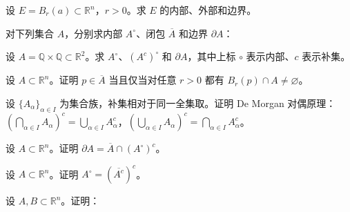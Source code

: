 \noindent\begin{minipage}{\textwidth}
设 $E=B_r(a)\subset\mathbb R^n$，$r>0$。求 $E$ 的内部、外部和边界。
\end{minipage}\par\vfill
\newpage
\noindent\begin{minipage}{\textwidth}
对下列集合 $A$，分别求内部 $A^\circ$、闭包 $\overline A$ 和边界 $\partial A$：
\end{minipage}\par\vfill
\noindent\begin{minipage}{\textwidth}
设 $A=\mathbb Q\times\mathbb Q\subset\mathbb R^2$。求 $A^\circ$、$(A^c)^\circ$ 和 $\partial A$，其中上标 $\circ$ 表示内部、$c$ 表示补集。
\end{minipage}\par\vfill
\noindent\begin{minipage}{\textwidth}
设 $A\subset\mathbb R^n$。证明 $p\in\overline A$ 当且仅当对任意 $r>0$ 都有 $B_r(p)\cap A\ne\varnothing$。
\end{minipage}\par\vfill
\newpage
\noindent\begin{minipage}{\textwidth}
设 $\{A_\alpha\}_{\alpha\in I}$ 为集合族，补集相对于同一全集取。证明 De Morgan 对偶原理：$(\bigcap_{\alpha\in I}A_\alpha)^c=\bigcup_{\alpha\in I}A_\alpha^c$，$(\bigcup_{\alpha\in I}A_\alpha)^c=\bigcap_{\alpha\in I}A_\alpha^c$。
\end{minipage}\par\vfill
\noindent\begin{minipage}{\textwidth}
设 $A\subset\mathbb R^n$。证明 $\partial A=\overline A\cap(A^\circ)^c$。
\end{minipage}\par\vfill
\noindent\begin{minipage}{\textwidth}
设 $A\subset\mathbb R^n$。证明 $A^\circ=(\overline{A^c})^c$。
\end{minipage}\par\vfill
\newpage
\noindent\begin{minipage}{\textwidth}
设 $A,B\subset\mathbb R^n$。证明：
\end{minipage}\par\vfill
